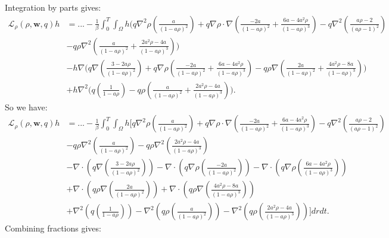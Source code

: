 \documentclass[11pt, a4paper]{article}
\theoremstyle{definition}
\newcommand{\w}{\mathbf{w}}
\begin{document}
Integration by parts gives:
\begin{align*}
	\mathcal{L}_\rho(\rho,\w,q)h &=... -\frac{1}{\beta}\int_0^T \int_\Omega h \bigg(q\nabla^2 \rho \left(\frac{a}{(1- a\rho)^2}\right)  + q \nabla \rho \cdot \nabla \left(\frac{-2a }{(1-a\rho)^2} + \frac{6a-4a^2  \rho}{(1-a\rho)^3} \right) - q \nabla^2 \left(\frac{a\rho -2}{(a\rho -1)^2}\right)\\
	&- q\rho  \nabla^2  \left(\frac{a }{(1-a\rho)^2} + \frac{2a^2\rho -4a}{(1-a\rho)^3} \right)\bigg)\\
	&-  h \nabla \bigg( q  \nabla \left( \frac{3-2a\rho}{(1-a\rho)^2} \right) + q \nabla \rho  \left( \frac{-2a }{(1-a\rho)^2} + \frac{6a-4a^2  \rho}{(1-a\rho)^3}  \right)- q\rho \nabla \left(\frac{2a }{(1-a\rho)^2} + \frac{4a^2\rho -8a}{(1-a\rho)^3} \right) \bigg)\\
	&+  h \nabla^2\bigg(q \left(\frac{1}{1- a\rho} \right)  - q\rho  \left(\frac{a }{(1-a\rho)^2} + \frac{2a^2\rho -4a}{(1-a\rho)^3} \right)  \bigg).
\end{align*}
So we have:
\begin{align*}
	\mathcal{L}_\rho(\rho,\w,q)h &=... -\frac{1}{\beta}\int_0^T\int_\Omega h \bigg[  q\nabla^2 \rho \left(\frac{a}{(1- a\rho)^2}\right)  + q \nabla \rho \cdot \nabla \left(\frac{-2a }{(1-a\rho)^2}+ \frac{6a-4a^2  \rho}{(1-a\rho)^3}  \right) - q \nabla^2 \left(\frac{a\rho -2}{(a\rho -1)^2}\right)\\
	&- q\rho  \nabla^2  \left(\frac{a }{(1-a\rho)^2} \right) - q\rho  \nabla^2  \left(\frac{2a^2\rho -4a}{(1-a\rho)^3} \right)\\
	& -\nabla \cdot \left( q  \nabla \left( \frac{3-2a\rho}{(1-a\rho)^2} \right) \right) - \nabla \cdot \left( q \nabla \rho  \left( \frac{-2a }{(1-a\rho)^2} \right)\right)  - \nabla \cdot \left( q \nabla \rho  \left(\frac{6a-4a^2  \rho}{(1-a\rho)^3}  \right)\right)  \\
	& + \nabla \cdot\left( q\rho \nabla \left(\frac{2a }{(1-a\rho)^2} \right) \right) + \nabla \cdot\left( q\rho \nabla \left( \frac{4a^2\rho -8a}{(1-a\rho)^3} \right) \right)\\
	&+   \nabla^2 \left(q \left(\frac{1}{1- a\rho} \right) \right) - \nabla^2 \left(q\rho  \left(\frac{a }{(1-a\rho)^2}\right)\right) - \nabla^2 \left(q\rho \left(\frac{2a^2\rho -4a}{(1-a\rho)^3} \right)\right)\bigg] dr dt .
\end{align*}
Combining fractions gives:
\end{document}
